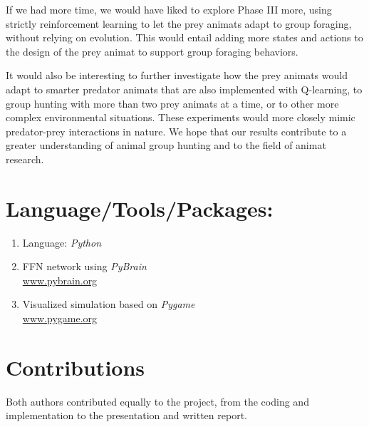 \documentclass[10pt,conference,letterpaper,doublecolumn]{IEEEtran}
\begin{document}
If we had more time, we would have liked to explore Phase III more, using strictly reinforcement learning to let the prey animats adapt to group foraging, without relying on evolution. This would entail adding more states and actions to the design of the prey animat to support group foraging behaviors. 

It would also be interesting to further investigate how the prey animats would adapt to smarter predator animats that are also implemented with Q-learning, to group hunting with more than two prey animats at a time, or to other more complex environmental situations. These experiments would more closely mimic predator-prey interactions in nature. We hope that our results contribute to a greater understanding of animal group hunting and to the field of animat research.


\section{Language/Tools/Packages:} 
\begin{enumerate}
\item Language: \emph{Python}
\item FFN network using \emph{PyBrain} \\
\underline{www.pybrain.org}
\item Visualized simulation based on \emph{Pygame} \\
\underline{www.pygame.org}
\end{enumerate}


\section{Contributions}
Both authors contributed equally to the project, from the coding and implementation to the presentation and written report.

\end{document}
